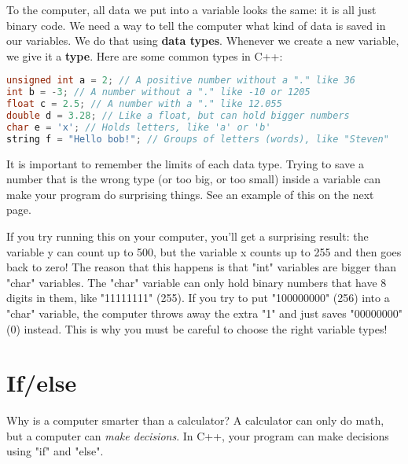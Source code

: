 \documentclass[a4paper,12pt]{article} %
\begin{document}
\noindent
To the computer, all data we put into a variable looks the same: it is all just binary code. We need a way to tell the computer what kind of data is saved in our variables. We do that using \textbf{data types}. Whenever we create a new variable, we give it a \textbf{type}. Here are some common types in C++:

\vspace{5mm}
\begin{lstlisting}[language=C++]
unsigned int a = 2; // A positive number without a "." like 36
int b = -3; // A number without a "." like -10 or 1205
float c = 2.5; // A number with a "." like 12.055
double d = 3.28; // Like a float, but can hold bigger numbers
char e = 'x'; // Holds letters, like 'a' or 'b'
string f = "Hello bob!"; // Groups of letters (words), like "Steven"
\end{lstlisting}

\noindent
It is important to remember the limits of each data type. Trying to save a number that is the wrong type (or too big, or too small) inside a variable can make your program do surprising things. See an example of this on the next page.

\clearpage

\vspace{5mm}




\noindent
If you try running this on your computer, you'll get a surprising result: the variable y can count up to 500, but the variable x counts up to 255 and then goes back to zero! The reason that this happens is that "int" variables are bigger than "char" variables. The "char" variable can only hold binary numbers that have 8 digits in them, like "11111111" (255). If you try to put "100000000" (256) into a "char" variable, the computer throws away the extra "1" and just saves "00000000" (0) instead. This is why you must be careful to choose the right variable types!

\section{If/else}

Why is a computer smarter than a calculator? A calculator can only do math, but a computer can \emph{make decisions}. In C++, your program can make decisions using "if" and "else".

\vspace{5mm}

\vspace{5mm}
\end{document}
